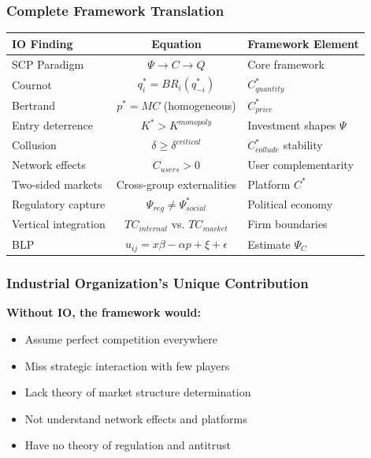 \subsubsection{Complete Framework Translation}

\begin{center}
\renewcommand{\arraystretch}{1.5}
\begin{tabular}{|l|c|l|}
\hline
\textbf{IO Finding} & \textbf{Equation} & \textbf{Framework Element} \\
\hline
SCP Paradigm & $\Psi \to C \to Q$ & Core framework \\
\hline
Cournot & $q_i^* = BR_i(q_{-i}^*)$ & $C^*_{quantity}$ \\
\hline
Bertrand & $p^* = MC$ (homogeneous) & $C^*_{price}$ \\
\hline
Entry deterrence & $K^* > K^{monopoly}$ & Investment shapes $\Psi$ \\
\hline
Collusion & $\delta \geq \delta^{critical}$ & $C^*_{collude}$ stability \\
\hline
Network effects & $C_{users} > 0$ & User complementarity \\
\hline
Two-sided markets & Cross-group externalities & Platform $C^*$ \\
\hline
Regulatory capture & $\Psi_{reg} \neq \Psi^*_{social}$ & Political economy \\
\hline
Vertical integration & $TC_{internal}$ vs. $TC_{market}$ & Firm boundaries \\
\hline
BLP & $u_{ij} = x\beta - \alpha p + \xi + \epsilon$ & Estimate $\Psi_C$ \\
\hline
\end{tabular}
\end{center}

\subsubsection{Industrial Organization's Unique Contribution}

\textbf{Without IO, the framework would:}
\begin{itemize}
    \item Assume perfect competition everywhere
    \item Miss strategic interaction with few players
    \item Lack theory of market structure determination
    \item Not understand network effects and platforms
    \item Have no theory of regulation and antitrust
\end{itemize}

